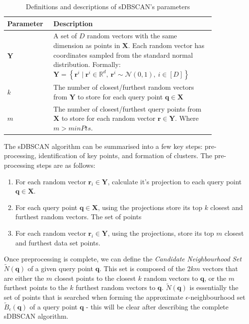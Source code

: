 \documentclass{article}
\newcommand{\bX}{\mathbf{X}}
\newcommand{\bY}{\mathbf{Y}}
\newcommand{\br}{\mathbf{r}}
\newcommand{\bq}{\mathbf{q}}
\newcommand{\eps}{\epsilon}
\newcommand{\Bqt}{\widetilde{B}_{\eps}(\bq)}
\newcommand{\Nqt}{\widetilde{N}(\bq)}
\begin{document}
\begin{table}[H]
	\centering
	\begin{tabular}{|>{\raggedright}p{0.15\linewidth}|>{\raggedright\arraybackslash}p{0.7\linewidth}|}
		\hline
		\textbf{Parameter} & \textbf{Description} \\ 
		\hline
		$\mathbf{Y}$ & A set of $D$ random vectors with the same dimension as points in $\bX$. Each random vector has coordinates sampled from the standard normal distribution. Formally: $\mathbf{Y} = \left\{ \br^i \mid \br^i \in \mathbb{R}^d, \ \br^i \sim \mathcal{N}(0,1), \ i \in [D] \right\}$ \\ \hline
		$k$ & The number of closest/furthest random vectors from $\bY$ to store for each query point $\bq \in \bX$ \\ \hline
		$m$ & The number of closest/furthest query points from $\bX$ to store for each random vector $\br \in \bY$. Where $m > minPts$.\\ \hline
	\end{tabular}
	\caption{Definitions and descriptions of sDBSCAN's parameters}
	\label{tab:definitions}
\end{table}


The sDBSCAN algorithm can be summarised into a few key steps: pre-processing, identification of key points, and formation of clusters. The pre-processing steps are as follows:

\begin{enumerate}
	\item For each random vector $\br_i \in \bY$, calculate it's projection to each query point $\bq \in \bX$. 
	\item For each query point $\bq \in \bX$, using the projections store its top $k$ closest and furthest random vectors. The set of points 
	\item For each random vector $\br_i \in \bY$, using the projections, store its top $m$ closest and furthest data set points.
\end{enumerate}

Once preprocessing is complete, we can define the \textit{Candidate Neighbourhood Set} $\Nqt$ of a given query point $\bq$. This set is composed of the $2km$ vectors that are either the $m$ closest points to the closest $k$ random vectors to $\bq$, or the $m$ furthest points to the $k$ furthest random vectors to $\bq$. $\Nqt$ is essentially the set of points that is searched when forming the approximate $\eps$-neighbourhood set $\Bqt$ of a query point $\bq$ - this will be clear after describing the complete sDBSCAN algorithm. 
\end{document}
